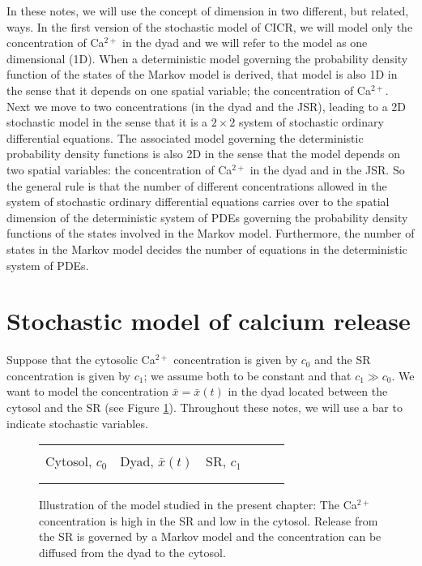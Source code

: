 In these notes, we will use the concept of dimension in two different, but related,  ways. In the first version of the stochastic model of CICR, we will model only the concentration of Ca$^{2+}$ in the dyad and we will refer to the model as one dimensional (1D). When a deterministic model governing the probability density function of the states of the Markov model is derived, that model is also 1D in the sense that it depends on one spatial variable; the concentration of Ca$^{2+}$. Next we move to two concentrations (in the dyad and the JSR), leading to a 2D stochastic model in the sense that it is a $2\times 2$ system of stochastic ordinary differential equations. The associated model governing the deterministic probability density functions is also 2D in the sense that the model depends on two spatial variables: the concentration of Ca$^{2+}$ in the dyad and in the JSR. So the general rule is that the number of different concentrations allowed in the system of stochastic ordinary differential equations carries over to the spatial dimension of the deterministic system of PDEs governing the probability density functions of the states involved in the Markov model. Furthermore, the number of states in the Markov model decides the number of equations in the deterministic system of PDEs. 


\section{Stochastic model of calcium release \label{stoch}}

Suppose that the cytosolic Ca$^{2+}$  concentration is given by $c_{0}$ and the SR
concentration is given by $c_{1}$; we assume both to be constant and that
$c_{1}\gg c_{0}$. We want to model the concentration $\bar{x}=\bar{x}(t)$ in the dyad located
between the cytosol and the SR (see Figure \ref{geom1D}). Throughout these notes, we will use a bar to indicate stochastic variables.

\begin{figure}
[ptb]
\begin{center}
\begin{tabular}{c!{\vrule width 1pt}c!{\vrule width 1pt}c} 
&& \\
Cytosol, $c_0$ & Dyad, $\bar{x}(t)$ & SR, $c_1$ \ \ \ \ \  \\
&& \\ 
\end{tabular}
\caption{Illustration of the model studied in the present chapter: The Ca$^{2+}$ concentration is high in the SR and low in the cytosol. Release from the SR is governed by a Markov model and the
concentration can be diffused from the dyad to the cytosol.}%
\label{geom1D}%
\end{center}
\end{figure}

